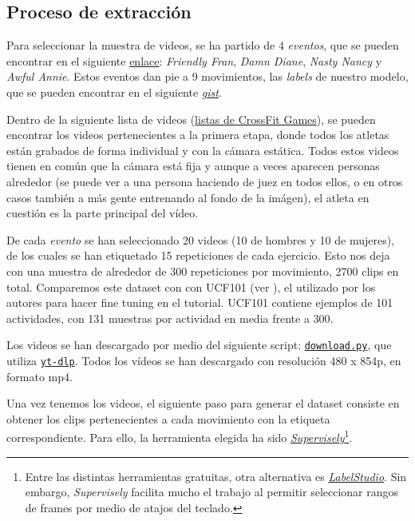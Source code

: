 \subsection{Proceso de extracción}

Para seleccionar la muestra de videos, se ha partido de 4 \textit{eventos}, que se pueden encontrar en el siguiente \href{https://games.crossfit.com/workouts/games/2020}{enlace}: \textit{Friendly Fran}, \textit{Damn Diane}, \textit{Nasty Nancy} y \textit{Awful Annie}. Estos eventos dan pie a 9 movimientos, las \textit{labels} de nuestro modelo, que se pueden encontrar en el siguiente \href{https://gist.github.com/plaguss/58091caefee6acb39ae51cbc241b3cf9/raw/labels.txt}{\textit{gist}}.

Dentro de la siguiente lista de videos (\href{https://www.youtube.com/c/CrossFitGamesTV/playlists}{listas de CrossFit Games}), se pueden encontrar los videos pertenecientes a la primera etapa, donde todos los atletas están grabados de forma individual y con la cámara estática. Todos estos videos tienen en común que la cámara está fija y aunque a veces aparecen personas alrededor (se puede ver a una persona haciendo de juez en todos ellos, o en otros casos también a más gente entrenando al fondo de la imágen), el atleta en cuestión es la parte principal del vídeo.

De cada \textit{evento} se han seleccionado 20 videos (10 de hombres y 10 de mujeres), de los cuales se han etiquetado 15 repeticiones de cada ejercicio. Esto nos deja con una muestra de alrededor de 300 repeticiones por movimiento, 2700 clips en total. Comparemos este dataset con con UCF101 (ver \cite{UCF101}), el utilizado por los autores para hacer fine tuning en el tutorial. UCF101 contiene ejemplos de 101 actividades, con 131 muestras por actividad en media frente a 300.

Los videos se han descargado por medio del siguiente script: \href{https://github.com/plaguss/tfm-misc/blob/main/scripts/download.py}{\texttt{download.py}}, que utiliza \href{https://github.com/yt-dlp/yt-dlp}{\texttt{yt-dlp}}. Todos los vídeos se han descargado con resolución 480 x 854p, en formato mp4.

Una vez tenemos los videos, el siguiente paso para generar el dataset consiste en obtener los clips pertenecientes a cada movimiento con la etiqueta correspondiente. Para ello, la herramienta elegida ha sido \href{https://supervise.ly/}{\textit{Supervisely}}\footnote{Entre las distintas herramientas gratuitas, otra alternativa es \href{https://labelstud.io/}{\textit{LabelStudio}}. Sin embargo, \textit{Supervisely} facilita mucho el trabajo al permitir seleccionar rangos de frames por medio de atajos del teclado.}.

